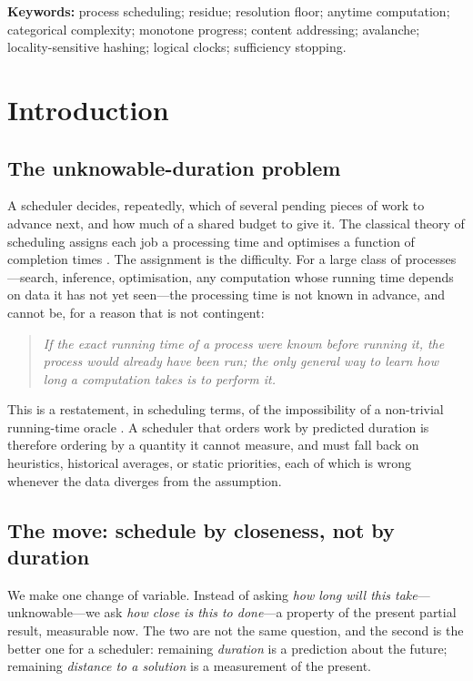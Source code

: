 \documentclass[twocolumn,10pt,a4paper]{article}
\theoremstyle{thmstyle}
\theoremstyle{definition}
\theoremstyle{remark}
\begin{document}
\noindent\textbf{Keywords:} process scheduling; residue; resolution
floor; anytime computation; categorical complexity; monotone progress;
content addressing; avalanche; locality-sensitive hashing; logical
clocks; sufficiency stopping.

\tableofcontents

\section{Introduction}
\label{sec:intro}

\subsection{The unknowable-duration problem}

A scheduler decides, repeatedly, which of several pending pieces of work
to advance next, and how much of a shared budget to give it. The
classical theory of scheduling assigns each job a processing time and
optimises a function of completion times \citep{pinedo2016,brucker2007,
liu1973}. The assignment is the difficulty. For a large class of
processes---search, inference, optimisation, any computation whose
running time depends on data it has not yet seen---the processing time is
not known in advance, and cannot be, for a reason that is not
contingent:

\begin{quote}\itshape
If the exact running time of a process were known before running it, the
process would already have been run; the only general way to learn how
long a computation takes is to perform it.
\end{quote}

This is a restatement, in scheduling terms, of the impossibility of a
non-trivial running-time oracle \citep{turing1936,blum1967}. A scheduler
that orders work by predicted duration is therefore ordering by a
quantity it cannot measure, and must fall back on heuristics, historical
averages, or static priorities, each of which is wrong whenever the data
diverges from the assumption.

\subsection{The move: schedule by closeness, not by duration}

We make one change of variable. Instead of asking \emph{how long will
this take}---unknowable---we ask \emph{how close is this to done}---a
property of the present partial result, measurable now. The two are not
the same question, and the second is the better one for a scheduler:
remaining \emph{duration} is a prediction about the future; remaining
\emph{distance to a solution} is a measurement of the present.
\end{document}
